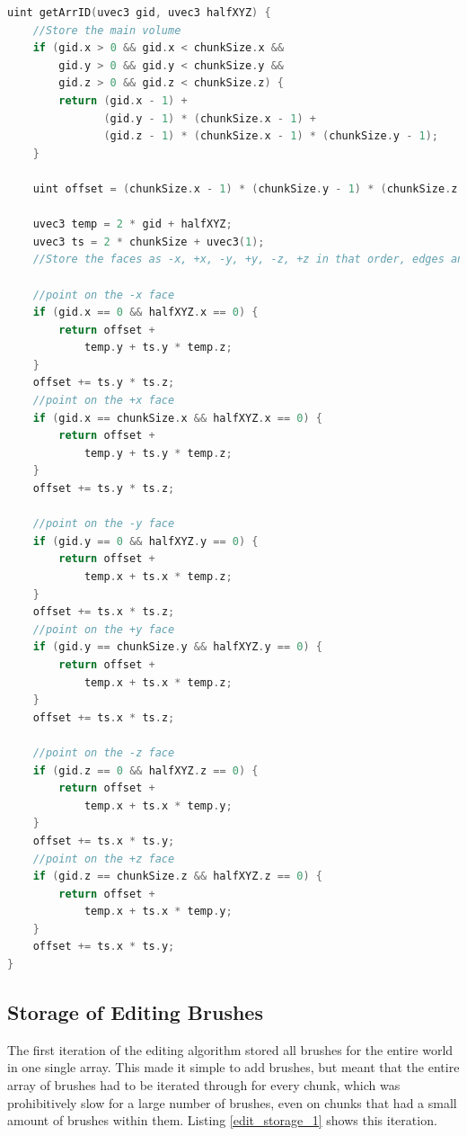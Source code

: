 \documentclass[11pt]{article}
\begin{document}
\begin{lstlisting}[language=C++,label={tv_arrID_2},caption={A more efficient \texttt{getArrID} function.}]
  uint getArrID(uvec3 gid, uvec3 halfXYZ) {
    //Store the main volume
    if (gid.x > 0 && gid.x < chunkSize.x &&
        gid.y > 0 && gid.y < chunkSize.y &&
        gid.z > 0 && gid.z < chunkSize.z) {
        return (gid.x - 1) +
               (gid.y - 1) * (chunkSize.x - 1) +
               (gid.z - 1) * (chunkSize.x - 1) * (chunkSize.y - 1); 
    }

    uint offset = (chunkSize.x - 1) * (chunkSize.y - 1) * (chunkSize.z - 1);

    uvec3 temp = 2 * gid + halfXYZ;
    uvec3 ts = 2 * chunkSize + uvec3(1);
    //Store the faces as -x, +x, -y, +y, -z, +z in that order, edges and corners are stored in the first place in this ordering (some unpopulated values)

    //point on the -x face
    if (gid.x == 0 && halfXYZ.x == 0) {
        return offset +
            temp.y + ts.y * temp.z;
    }
    offset += ts.y * ts.z;
    //point on the +x face
    if (gid.x == chunkSize.x && halfXYZ.x == 0) {
        return offset +
            temp.y + ts.y * temp.z;
    }
    offset += ts.y * ts.z;

    //point on the -y face
    if (gid.y == 0 && halfXYZ.y == 0) {
        return offset +
            temp.x + ts.x * temp.z;
    }
    offset += ts.x * ts.z;
    //point on the +y face
    if (gid.y == chunkSize.y && halfXYZ.y == 0) {
        return offset +
            temp.x + ts.x * temp.z;
    }
    offset += ts.x * ts.z;

    //point on the -z face
    if (gid.z == 0 && halfXYZ.z == 0) {
        return offset +
            temp.x + ts.x * temp.y;
    }
    offset += ts.x * ts.y;
    //point on the +z face
    if (gid.z == chunkSize.z && halfXYZ.z == 0) {
        return offset +
            temp.x + ts.x * temp.y;
    }
    offset += ts.x * ts.y;
}
\end{lstlisting}

\subsection{Storage of Editing Brushes}
The first iteration of the editing algorithm stored all brushes for the entire world in one single array. This made it simple to add brushes, but meant that the entire array of brushes had to be iterated through for every chunk, which was prohibitively slow for a large number of brushes, even on chunks that had a small amount of brushes within them. Listing \ref{edit_storage_1} shows this iteration.
\end{document}
